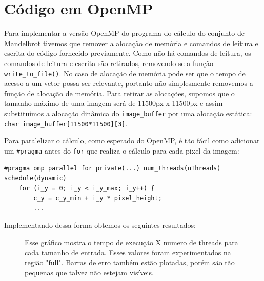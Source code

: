 \documentclass[12pt]{article}
\newcommand{\code}[1]{\texttt{#1}}
\begin{document}
\newpage
\section{Código em OpenMP}
Para implementar a versão OpenMP do programa do cálculo do conjunto de 
Mandelbrot tivemos que remover a alocação de memória e comandos de 
leitura e escrita do código fornecido previamente. Como não há comandos
de leitura, os comandos de leitura e escrita são retirados, removendo-se
a função \code{write\_to\_file()}. No caso de alocação de memória pode 
ser que o tempo de acesso a um vetor possa ser relevante, portanto não
simplesmente removemos a função de alocação de memória. Para retirar as
alocações, supomos que o tamanho máximo de uma imagem será de 11500px x
11500px e assim substituímos a alocação dinâmica do \code{image\_buffer}
por uma alocação estática: \code{char image\_buffer[11500*11500][3]}.

Para paralelizar o cálculo, como esperado do OpenMP, é tão fácil como
adicionar um \code{\#pragma} antes do \code{for} que realiza o cálculo
para cada pixel da imagem:
\begin{lstlisting}[style=CStyle]
    #pragma omp parallel for private(...) num_threads(nThreads) schedule(dynamic)
    for (i_y = 0; i_y < i_y_max; i_y++) {
        c_y = c_y_min + i_y * pixel_height;
        ...
\end{lstlisting}

Implementando dessa forma obtemos os seguintes resultados:
\begin{figure}[H]
    \caption{Esse gráfico mostra o tempo de execução X numero de threads para cada tamanho de entrada. Esses valores foram experimentados na região "full". Barras de erro também estão plotadas, porém são tão pequenas que talvez não estejam visíveis.}
\end{figure}
\end{document}
